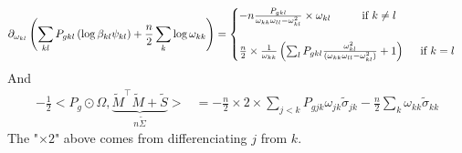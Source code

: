 \documentclass[11pt,a4paper]{article}
\begin{document}
\[
 \partial_{\omega_{kl}}\left(\sum_{kl} P_{gkl} \left(\log  \beta_{kl}\psi_{kl}\right) +\frac{n}{2} \sum_k \log \omega_{kk}\right) =\begin{cases}
               -n \frac{P_{gkl} }{\omega_{kk}\omega_{ll}-\omega_{kl}^2}\times \omega_{kl} \text{\hspace{1cm}if $k\neq l$}\\\\
              \frac{n}{2} \times\frac{1}{\omega_{kk}} \left(\sum_l P_{gkl} \frac{\omega_{kl}^2}{(\omega_{kk}\omega_{ll}-\omega_{kl}^2)} + 1\right)\text{\hspace{0.5cm}if $k = l$}
            \end{cases}
\]
And
\begin{align*}
- \frac{1}{2} <P_g \odot \Omega, \underbrace{\widetilde{M}^\intercal \widetilde{M} + \widetilde{S}}_{n\widetilde{\Sigma}}> &=- \frac{n}{2}\times 2 \times \sum_{j<k}P_{gjk} \omega_{jk} \widetilde{\sigma}_{jk}- \frac{n}{2}\sum_{ k} \omega_{kk} \widetilde{\sigma}_{kk}
\end{align*}
The "$\times 2$" above comes from differenciating $j$ from $k$.
\end{document}
